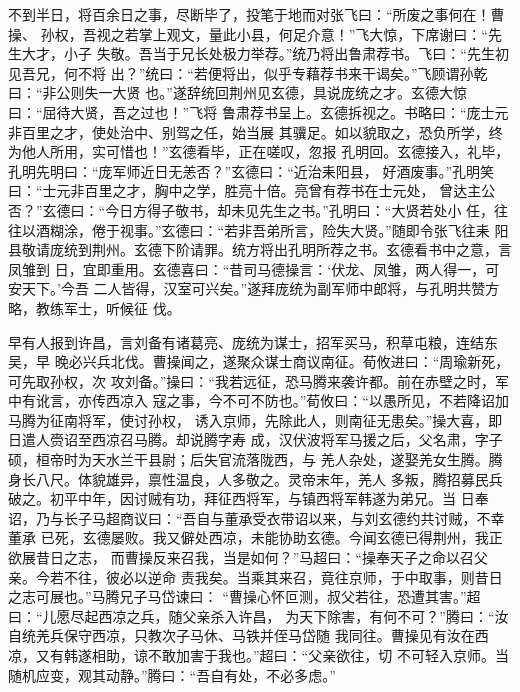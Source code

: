 不到半日，将百余日之事，尽断毕了，投笔于地而对张飞曰：“所废之事何在！曹操、
孙权，吾视之若掌上观文，量此小县，何足介意！”飞大惊，下席谢曰：“先生大才，小子
失敬。吾当于兄长处极力举荐。”统乃将出鲁肃荐书。飞曰：“先生初见吾兄，何不将
出？”统曰：“若便将出，似乎专藉荐书来干谒矣。”飞顾谓孙乾曰：“非公则失一大贤
也。”遂辞统回荆州见玄德，具说庞统之才。玄德大惊曰：“屈待大贤，吾之过也！”飞将
鲁肃荐书呈上。玄德拆视之。书略曰：“庞士元非百里之才，使处治中、别驾之任，始当展
其骥足。如以貌取之，恐负所学，终为他人所用，实可惜也！”玄德看毕，正在嗟叹，忽报
孔明回。玄德接入，礼毕，孔明先明曰：“庞军师近日无恙否？”玄德曰：“近治耒阳县，
好酒废事。”孔明笑曰：“士元非百里之才，胸中之学，胜亮十倍。亮曾有荐书在士元处，
曾达主公否？”玄德曰：“今日方得子敬书，却未见先生之书。”孔明曰：“大贤若处小
任，往往以酒糊涂，倦于视事。”玄德曰：“若非吾弟所言，险失大贤。”随即令张飞往耒
阳县敬请庞统到荆州。玄德下阶请罪。统方将出孔明所荐之书。玄德看书中之意，言凤雏到
日，宜即重用。玄德喜曰：“昔司马德操言：‘伏龙、凤雏，两人得一，可安天下。’今吾
二人皆得，汉室可兴矣。”遂拜庞统为副军师中郎将，与孔明共赞方略，教练军士，听候征
伐。

早有人报到许昌，言刘备有诸葛亮、庞统为谋士，招军买马，积草屯粮，连结东吴，早
晚必兴兵北伐。曹操闻之，遂聚众谋士商议南征。荀攸进曰：“周瑜新死，可先取孙权，次
攻刘备。”操曰：“我若远征，恐马腾来袭许都。前在赤壁之时，军中有讹言，亦传西凉入
寇之事，今不可不防也。”荀攸曰：“以愚所见，不若降诏加马腾为征南将军，使讨孙权，
诱入京师，先除此人，则南征无患矣。”操大喜，即日遣人赍诏至西凉召马腾。却说腾字寿
成，汉伏波将军马援之后，父名肃，字子硕，桓帝时为天水兰干县尉；后失官流落陇西，与
羌人杂处，遂娶羌女生腾。腾身长八尺。体貌雄异，禀性温良，人多敬之。灵帝末年，羌人
多叛，腾招募民兵破之。初平中年，因讨贼有功，拜征西将军，与镇西将军韩遂为弟兄。当
日奉诏，乃与长子马超商议曰：“吾自与董承受衣带诏以来，与刘玄德约共讨贼，不幸董承
已死，玄德屡败。我又僻处西凉，未能协助玄德。今闻玄德已得荆州，我正欲展昔日之志，
而曹操反来召我，当是如何？”马超曰：“操奉天子之命以召父亲。今若不往，彼必以逆命
责我矣。当乘其来召，竟往京师，于中取事，则昔日之志可展也。”马腾兄子马岱谏曰：
“曹操心怀叵测，叔父若往，恐遭其害。”超曰：“儿愿尽起西凉之兵，随父亲杀入许昌，
为天下除害，有何不可？”腾曰：“汝自统羌兵保守西凉，只教次子马休、马铁并侄马岱随
我同往。曹操见有汝在西凉，又有韩遂相助，谅不敢加害于我也。”超曰：“父亲欲往，切
不可轻入京师。当随机应变，观其动静。”腾曰：“吾自有处，不必多虑。”

